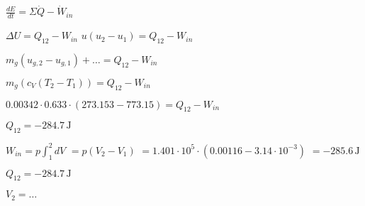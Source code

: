 \( \frac{dE}{dt} = \Sigma \dot{Q} - \dot{W}_{in} \)  

\( \Delta U = Q_{12} - W_{in} \)  
\( u (u_2 - u_1) = Q_{12} - W_{in} \)  

\( m_g (u_{g,2} - u_{g,1}) + \dots = Q_{12} - W_{in} \)  

\( m_g (c_V (T_2 - T_1)) = Q_{12} - W_{in} \)  

\( 0.00342 \cdot 0.633 \cdot (273.153 - 773.15) = Q_{12} - W_{in} \)  

\( Q_{12} = -284.7 \, \text{J} \)  

\( W_{in} = p \int_{1}^{2} dV \)  
\( = p (V_2 - V_1) \)  
\( = 1.401 \cdot 10^5 \cdot (0.00116 - 3.14 \cdot 10^{-3}) \)  
\( = -285.6 \, \text{J} \)  

\( Q_{12} = -284.7 \, \text{J} \)  

\( V_2 = \dots \)
